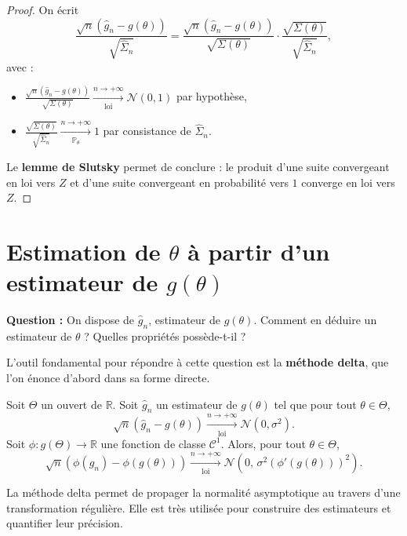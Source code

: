 \begin{proof}
On écrit
\[
\frac{\sqrt{n}\left(\hat{g}_n - g(\theta)\right)}{\sqrt{\hat{\Sigma}_n}}
= \frac{\sqrt{n}\left(\hat{g}_n - g(\theta)\right)}{\sqrt{\Sigma(\theta)}}
\cdot \frac{\sqrt{\Sigma(\theta)}}{\sqrt{\hat{\Sigma}_n}},
\]
avec :
\begin{itemize}
    \item $\displaystyle\frac{\sqrt{n}\left(\hat{g}_n - g(\theta)\right)}{\sqrt{\Sigma(\theta)}} \xrightarrow[\text{loi}]{n \to +\infty} \mathcal{N}(0,1)$ par hypothèse,
    \item $\displaystyle\frac{\sqrt{\Sigma(\theta)}}{\sqrt{\hat{\Sigma}_n}} \xrightarrow[\mathbb{P}_\theta]{n \to +\infty} 1$ par consistance de $\hat{\Sigma}_n$.
\end{itemize}
Le \textbf{lemme de Slutsky} permet de conclure : le produit d'une suite convergeant en loi vers $Z$ et d'une suite convergeant en probabilité vers $1$ converge en loi vers $Z$.
\end{proof}

\section{Estimation de $\theta$ à partir d'un estimateur de $g(\theta)$}

\textbf{Question :} On dispose de $\hat{g}_n$, estimateur de $g(\theta)$. Comment en déduire un estimateur de $\theta$ ? Quelles propriétés possède-t-il ?

\smallskip

L'outil fondamental pour répondre à cette question est la \textbf{méthode delta}, que l'on énonce d'abord dans sa forme directe.

\begin{mdframed}
\begin{proposition}
Soit $\Theta$ un ouvert de $\mathbb{R}$. Soit $\hat{g}_n$ un estimateur de $g(\theta)$ tel que pour tout $\theta \in \Theta$,
\[
\sqrt{n}\left(\hat{g}_n - g(\theta)\right) \xrightarrow[\text{loi}]{n \to +\infty} \mathcal{N}(0, \sigma^2).
\]
Soit $\phi : g(\Theta) \to \mathbb{R}$ une fonction de classe $\mathcal{C}^1$. Alors, pour tout $\theta \in \Theta$,
\[
\sqrt{n}\left(\phi(\hat{g}_n) - \phi(g(\theta))\right) \xrightarrow[\text{loi}]{n \to +\infty} \mathcal{N}\!\left(0,\, \sigma^2 \left(\phi'(g(\theta))\right)^2\right).
\]
\end{proposition}
\end{mdframed}

\begin{remarque}
La méthode delta permet de propager la normalité asymptotique au travers d'une transformation régulière. Elle est très utilisée pour construire des estimateurs et quantifier leur précision.
\end{remarque}

